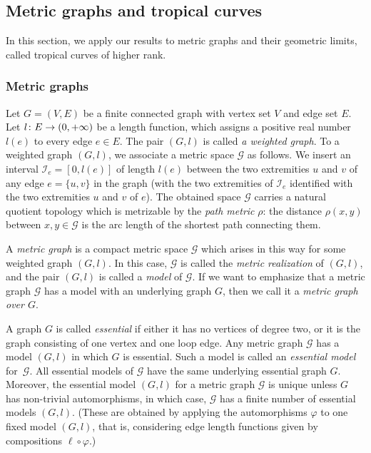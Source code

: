 \documentclass[AHL,Unicode,longabstracts]{cedram}
\newcommand{\mgr}{\mathcal{G}}
\newcommand{\Ical}{\mathcal{I}}
\renewcommand*{\to}{\mathchoice{\longrightarrow}{\rightarrow}{\rightarrow}{\rightarrow}}
\begin{document}
\subsection{Metric graphs and tropical curves} \label{ss:degeneration-metric-graphs}
In this section, we apply our results to metric graphs and their geometric limits, called tropical curves of higher rank.


\subsubsection{Metric graphs}

Let $G=(V, E)$ be a finite connected graph with vertex set $V$ and edge set $E$. Let $l \colon E \to (0,+\infty)$ be a length function, which assigns a positive real number $l(e)$ to every edge $e \in E$. The pair $(G, l)$ is called \emph{a weighted graph}. To a weighted graph $(G,l)$, we associate a metric space $\mgr$ as follows. We insert an interval $\Ical_e= [0,l(e)]$ of length $l(e)$ between the two extremities $u$ and $v$ of any edge $e=\{u,v\}$ in the graph (with the two extremities of $\Ical_e$ identified with the two extremities $u$ and $v$ of $e$). The obtained space $\mgr$ carries a natural quotient topology which is metrizable by the \emph{path metric} $\rho$: the distance $\rho(x,y)$ between $x,y \in \mgr$ is the arc length of the shortest path connecting them.


A \emph{metric graph} is a compact metric space $\mgr$ which arises in this way for some weighted graph $(G, l)$. In this case, $\mgr$ is called the \emph{metric realization} of $(G, l)$, and the pair $(G, l)$ is called a \emph{model} of $\mgr$. If we want to emphasize that a metric graph $\mgr$ has a model with an underlying graph $G$, then we call it a \emph{metric graph over $G$}.

A graph $G$ is called \emph{essential} if either it has no vertices of degree two, or it is the graph consisting of one vertex and one loop edge. Any metric graph $\mgr$ has a model $(G,l)$ in which $G$ is essential. Such a model is called an \emph{essential model} for~$\mgr$. All essential models of $\mgr$ have the same underlying essential graph $G$. Moreover, the essential model $(G,l)$ for a metric graph $\mgr$ is unique unless $G$ has non-trivial automorphisms, in which case, $\mgr$ has a finite number of essential models $(G, l)$. (These are obtained by applying the automorphisms $\varphi$ to one fixed model $(G,l)$, that is, considering edge length functions given by compositions $\ell \circ \varphi$.)
\end{document}
